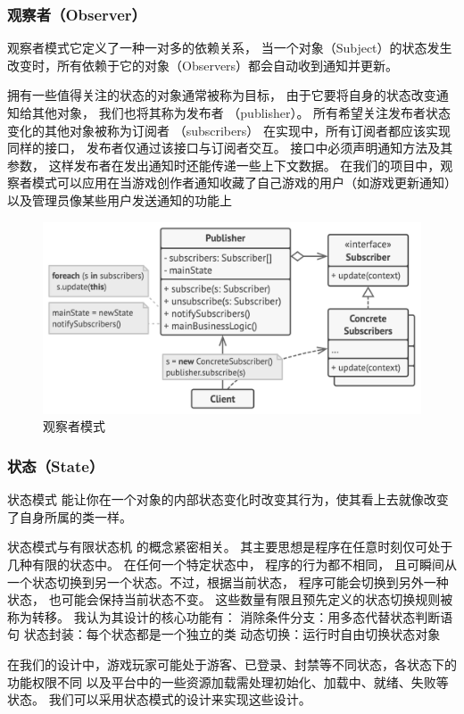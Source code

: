\documentclass[12pt]{ctexart} %
\begin{document}
\subsubsection{观察者（Observer）}
观察者模式它定义了一种一对多的依赖关系，
当一个对象（Subject）的状态发生改变时，所有依赖于它的对象（Observers）都会自动收到通知并更新。

拥有一些值得关注的状态的对象通常被称为目标， 由于它要将自身的状态改变通知给其他对象， 
我们也将其称为发布者 （publisher）。 所有希望关注发布者状态变化的其他对象被称为订阅者 （subscribers）
在实现中，所有订阅者都应该实现同样的接口， 发布者仅通过该接口与订阅者交互。 
接口中必须声明通知方法及其参数， 这样发布者在发出通知时还能传递一些上下文数据。
在我们的项⽬中，观察者模式可以应⽤在当游戏创作者通知收藏了自己游戏的用户（如游戏更新通知）
以及管理员像某些用户发送通知的功能上

\begin{figure}[H]
  \centering
  \includegraphics[width=1\textwidth]{guancha.png}
  \caption{观察者模式}
\end{figure}

\subsubsection{状态（State）} 
状态模式 能让你在一个对象的内部状态变化时改变其行为，使其看上去就像改变了自身所属的类一样。

状态模式与有限状态机 的概念紧密相关。
其主要思想是程序在任意时刻仅可处于几种有限的状态中。 在任何一个特定状态中， 程序的行为都不相同， 
且可瞬间从一个状态切换到另一个状态。不过，根据当前状态，
程序可能会切换到另外一种状态， 也可能会保持当前状态不变。 
这些数量有限且预先定义的状态切换规则被称为转移。
我认为其设计的核心功能有：
消除条件分支：用多态代替状态判断语句
状态封装：每个状态都是一个独立的类
动态切换：运行时自由切换状态对象

在我们的设计中，游戏玩家可能处于游客、已登录、封禁等不同状态，各状态下的功能权限不同
以及平台中的一些资源加载需处理初始化、加载中、就绪、失败等状态。
我们可以采用状态模式的设计来实现这些设计。
\end{document}
